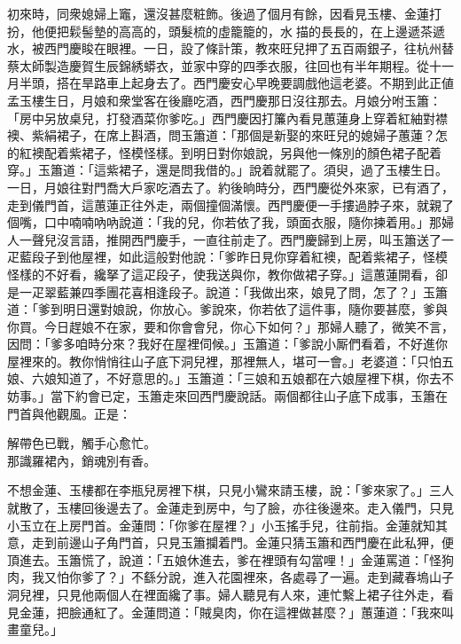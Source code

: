 初來時，同衆媳婦上竈，還沒甚麼粧飾。後過了個月有餘，因看見玉樓、金蓮打扮，他便把鬏髻墊的高高的，頭髮梳的虛籠籠的，水𩬆描的長長的，{}在上邊遞茶遞水，被西門慶睃在眼裡。{}一日，設了條計策，教來旺兒押了五百兩銀子，往杭州替蔡太師製造慶賀生辰錦綉蟒衣，並家中穿的四季衣服，往回也有半年期程。從十一月半頭，搭在旱路車上起身去了。西門慶安心早晚要調戲他這老婆。不期到此正値孟玉樓生日，月娘和衆堂客在後廳吃酒，西門慶那日沒往那去。月娘分咐玉簫：「房中另放桌兒，打發酒菜你爹吃。」西門慶因打簾內看見蕙蓮身上穿着紅紬對襟襖、紫絹裙子，在席上斟酒，問玉簫道：「那個是新娶的來旺兒的媳婦子蕙蓮？怎的紅襖配着紫裙子，怪模怪樣。{}到明日對你娘說，另與他一條別的顏色裙子配着穿。」玉簫道：「這紫裙子，還是問我借的。」說着就罷了。須臾，過了玉樓生日。一日，月娘往對門喬大戶家吃酒去了。約後晌時分，西門慶從外來家，已有酒了，走到儀門首，這蕙蓮正往外走，兩個撞個滿懷。西門慶便一手摟過脖子來，就親了個嘴，口中喃喃吶吶說道：「我的兒，你若依了我，頭面衣服，隨你揀着用。」{}那婦人一聲兒沒言語，推開西門慶手，一直往前走了。西門慶歸到上房，叫玉簫送了一疋藍段子到他屋裡，如此這般對他說：「爹昨日見你穿着紅襖，配着紫裙子，怪模怪樣的不好看，纔拏了這疋段子，使我送與你，教你做裙子穿。」這蕙蓮開看，卻是一疋翠藍兼四季團花喜相逢段子。說道：「我做出來，娘見了問，怎了？」玉簫道：「爹到明日還對娘說，你放心。爹說來，你若依了這件事，隨你要甚麼，爹與你買。今日趕娘不在家，要和你會會兒，你心下如何？」那婦人聽了，微笑不言，因問：「爹多咱時分來？我好在屋裡伺候。」玉簫道：「爹說小厮們看着，不好進你屋裡來的。教你悄悄往山子底下洞兒裡，那裡無人，堪可一會。」老婆道：「只怕五娘、六娘知道了，不好意思的。」玉簫道：「三娘和五娘都在六娘屋裡下棋，你去不妨事。」當下約會已定，玉簫走來回西門慶說話。兩個都往山子底下成事，玉簫在門首與他觀風。正是：

\begin{myquote} 
解帶色已戰，{}觸手心愈忙。\\
那識羅裙內，銷魂別有香。
\end{myquote} 

不想金蓮、玉樓都在李瓶兒房裡下棋，只見小鸞來請玉樓，說：「爹來家了。」三人就散了，玉樓回後邊去了。金蓮走到房中，勻了臉，{}亦往後邊來。走入儀門，只見小玉立在上房門首。金蓮問：「你爹在屋裡？」小玉搖手兒，往前指。{}金蓮就知其意，走到前邊山子角門首，只見玉簫攔着門。金蓮只猜玉簫和西門慶在此私狎，便頂進去。玉簫慌了，說道：「五娘休進去，爹在裡頭有勾當哩！」金蓮罵道：「怪狗肉，我又怕你爹了？」不繇分說，進入花園裡來，各處尋了一遍。走到藏春塢山子洞兒裡，只見他兩個人在裡面纔了事。婦人聽見有人來，連忙繫上裙子往外走，看見金蓮，把臉通紅了。金蓮問道：「賊臭肉，你在這裡做甚麼？」蕙蓮道：「我來叫畫童兒。」

